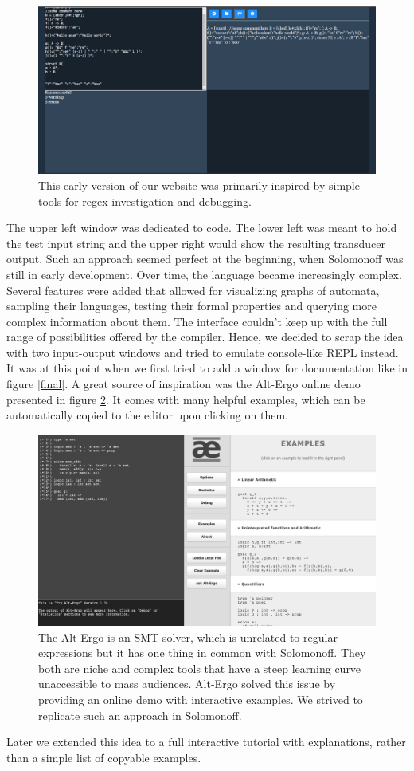 \begin{figure}
	\includegraphics[scale=0.2]{web3.png}
	\caption{This early version of our website was primarily inspired by simple tools for regex investigation and debugging.}
	\label{stage3}
\end{figure}
The upper left window was dedicated to code. The lower left was meant to hold the test input string and the upper right would show the resulting transducer output. Such an approach seemed perfect at the beginning, when Solomonoff was still in early development. Over time, the language became increasingly complex. Several features were added that allowed for visualizing graphs of automata, sampling their languages, testing their formal properties and querying more complex information about them. The interface couldn't keep up with the full range of possibilities offered by the compiler. Hence, we decided to scrap the idea with two input-output windows and tried to emulate console-like REPL instead. 
It was at this point when we first tried to add a window for documentation like in figure \ref{final}. A great source of inspiration was the Alt-Ergo online demo presented in figure \ref{altergo}. It comes with many helpful examples, which can be automatically copied to the editor upon clicking on them.
\begin{figure}
	\includegraphics[scale=0.3]{alt-ergo.png}
	\caption{The Alt-Ergo is an SMT solver, which is unrelated to regular expressions but it has one thing in common with Solomonoff. They both are niche and complex tools that have a steep learning curve unaccessible to mass audiences. Alt-Ergo solved this issue by providing an online demo with interactive examples. We strived to replicate such an approach in Solomonoff.}
	\label{altergo}
\end{figure}
Later we extended this idea to a full interactive tutorial with explanations, rather than a simple list of copyable examples. 

